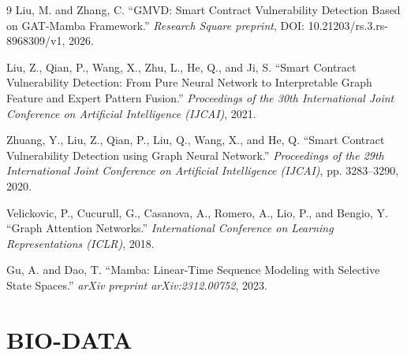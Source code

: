 \documentclass[12pt, a4paper, openright, twoside]{report}
\begin{document}
\begin{thebibliography}{9}
Liu, M. and Zhang, C. ``GMVD: Smart Contract Vulnerability Detection Based on GAT-Mamba Framework.'' \emph{Research Square preprint}, DOI: 10.21203/rs.3.rs-8968309/v1, 2026.

Liu, Z., Qian, P., Wang, X., Zhu, L., He, Q., and Ji, S. ``Smart Contract Vulnerability Detection: From Pure Neural Network to Interpretable Graph Feature and Expert Pattern Fusion.'' \emph{Proceedings of the 30th International Joint Conference on Artificial Intelligence (IJCAI)}, 2021.

Zhuang, Y., Liu, Z., Qian, P., Liu, Q., Wang, X., and He, Q. ``Smart Contract Vulnerability Detection using Graph Neural Network.'' \emph{Proceedings of the 29th International Joint Conference on Artificial Intelligence (IJCAI)}, pp. 3283--3290, 2020.

Velickovic, P., Cucurull, G., Casanova, A., Romero, A., Lio, P., and Bengio, Y. ``Graph Attention Networks.'' \emph{International Conference on Learning Representations (ICLR)}, 2018.

Gu, A. and Dao, T. ``Mamba: Linear-Time Sequence Modeling with Selective State Spaces.'' \emph{arXiv preprint arXiv:2312.00752}, 2023.

\end{thebibliography}

\clearpage
\appendix
\chapter{BIO-DATA}
\null
\null
\null
\null
\end{document}
